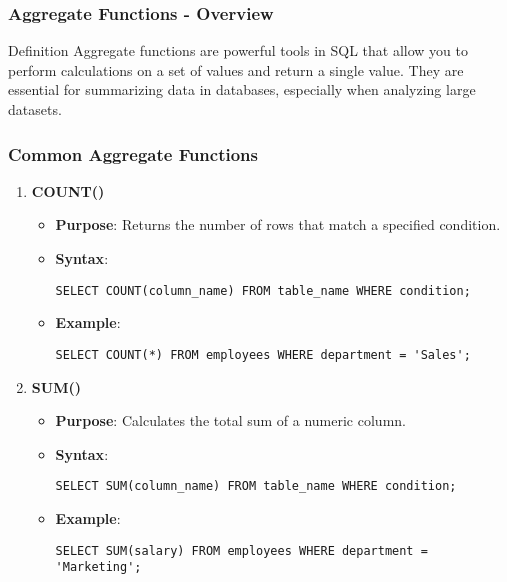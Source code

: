\documentclass{beamer}
\begin{document}
\begin{frame}[fragile]
    \frametitle{Aggregate Functions - Overview}
    \begin{block}{Definition}
        Aggregate functions are powerful tools in SQL that allow you to perform calculations on a set of values and return a single value. They are essential for summarizing data in databases, especially when analyzing large datasets.
    \end{block}
\end{frame}

\begin{frame}[fragile]
    \frametitle{Common Aggregate Functions}
    \begin{enumerate}
        \item \textbf{COUNT()}
        \begin{itemize}
            \item \textbf{Purpose}: Returns the number of rows that match a specified condition.
            \item \textbf{Syntax}:
            \begin{lstlisting}
SELECT COUNT(column_name) FROM table_name WHERE condition;
\end{lstlisting}
            \item \textbf{Example}:
            \begin{lstlisting}
SELECT COUNT(*) FROM employees WHERE department = 'Sales';
\end{lstlisting}
        \end{itemize}

        \item \textbf{SUM()}
        \begin{itemize}
            \item \textbf{Purpose}: Calculates the total sum of a numeric column.
            \item \textbf{Syntax}:
            \begin{lstlisting}
SELECT SUM(column_name) FROM table_name WHERE condition;
\end{lstlisting}
            \item \textbf{Example}:
            \begin{lstlisting}
SELECT SUM(salary) FROM employees WHERE department = 'Marketing';
\end{lstlisting}
        \end{itemize}
    \end{enumerate}
\end{frame}
\end{document}
